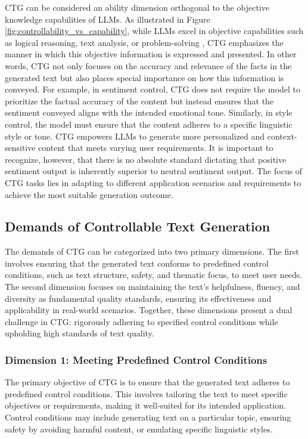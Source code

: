 \documentclass[acmsmall, screen]{acmart}
\begin{document}
CTG can be considered an ability dimension orthogonal to the objective knowledge capabilities of LLMs. As illustrated in Figure \ref{fig:controllability_vs_capability}, while LLMs excel in objective capabilities such as logical reasoning, text analysis, or problem-solving \cite{liang_arxiv24_ICSF}, CTG emphasizes the manner in which this objective information is expressed and presented. In other words, CTG not only focuses on the accuracy and relevance of the facts in the generated text but also places special importance on how this information is conveyed.
For example, in sentiment control, CTG does not require the model to prioritize the factual accuracy of the content but instead ensures that the sentiment conveyed aligns with the intended emotional tone. Similarly, in style control, the model must ensure that the content adheres to a specific linguistic style or tone. CTG empowers LLMs to generate more personalized and context-sensitive content that meets varying user requirements.
It is important to recognize, however, that there is no absolute standard dictating that positive sentiment output is inherently superior to neutral sentiment output. The focus of CTG tasks lies in adapting to different application scenarios and requirements to achieve the most suitable generation outcome.

\subsection{Demands of Controllable Text Generation}
\label{sec:ctg_dim}

The demands of CTG can be categorized into two primary dimensions. The first involves ensuring that the generated text conforms to predefined control conditions, such as text structure, safety, and thematic focus, to meet user needs. The second dimension focuses on maintaining the text's helpfulness, fluency, and diversity as fundamental quality standards, ensuring its effectiveness and applicability in real-world scenarios. Together, these dimensions present a dual challenge in CTG: rigorously adhering to specified control conditions while upholding high standards of text quality.

\subsubsection{\textbf{Dimension 1: Meeting Predefined Control Conditions}}
The primary objective of CTG is to ensure that the generated text adheres to predefined control conditions. This involves tailoring the text to meet specific objectives or requirements, making it well-suited for its intended application. Control conditions may include generating text on a particular topic, ensuring safety by avoiding harmful content, or emulating specific linguistic styles.
\end{document}
